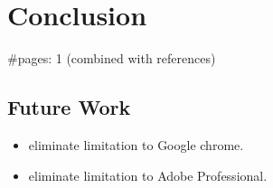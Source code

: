 \section{Conclusion}
\#pages: 1 (combined with references)
\subsection{Future Work}\label{sec:futurework}
\begin{itemize}
\item eliminate limitation to Google chrome.
\item eliminate limitation to Adobe Professional.
\end{itemize}
